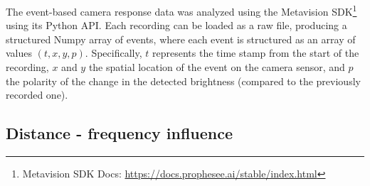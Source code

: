 The event-based camera response data was analyzed using the Metavision SDK\footnote{Metavision SDK Docs: \url{https://docs.prophesee.ai/stable/index.html}}
using its Python API. Each recording can be loaded as a raw file, producing a structured Numpy array of events, where each event is structured as an array of values
$(t, x, y, p)$. Specifically, $t$ represents the time stamp from the start of the recording, $x$ and $y$ the spatial location of the event
on the camera sensor, and $p$ the polarity of the change in the detected brightness (compared to the previously recorded one).

\subsection{Distance - frequency influence}

